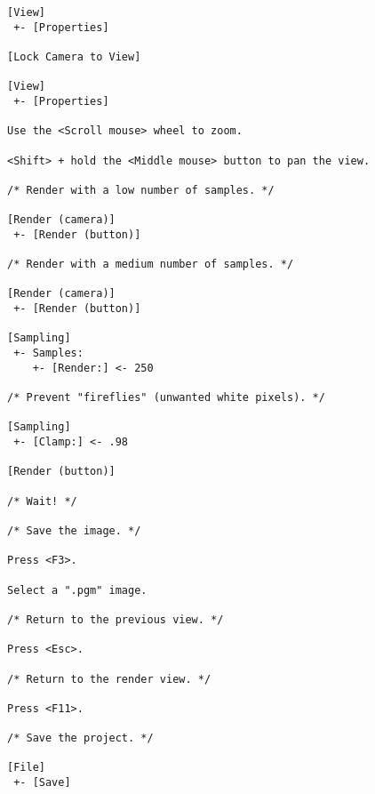 \begin{verbatim}
[View]
 +- [Properties]

[Lock Camera to View]

[View]
 +- [Properties]

Use the <Scroll mouse> wheel to zoom.

<Shift> + hold the <Middle mouse> button to pan the view.

/* Render with a low number of samples. */

[Render (camera)]
 +- [Render (button)]

/* Render with a medium number of samples. */

[Render (camera)]
 +- [Render (button)]

[Sampling]
 +- Samples:
    +- [Render:] <- 250

/* Prevent "fireflies" (unwanted white pixels). */

[Sampling]
 +- [Clamp:] <- .98

[Render (button)]

/* Wait! */

/* Save the image. */

Press <F3>.

Select a ".pgm" image.

/* Return to the previous view. */

Press <Esc>.

/* Return to the render view. */

Press <F11>.

/* Save the project. */

[File]
 +- [Save]

\end{verbatim}

